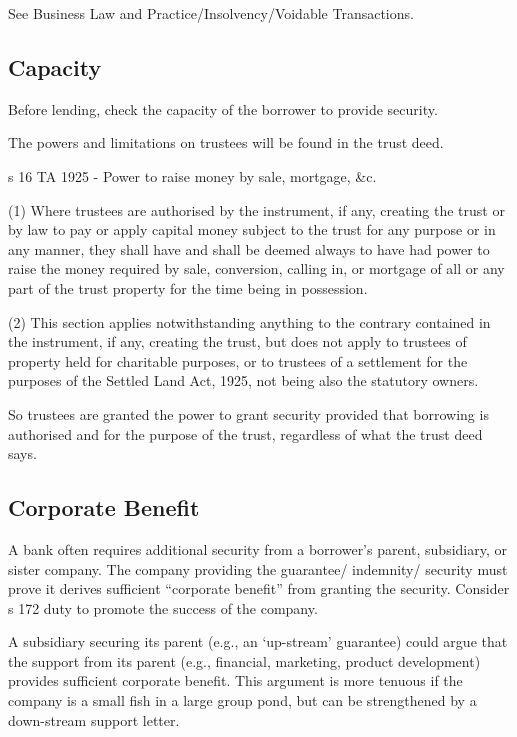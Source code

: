 \documentclass[
]{article}
\newenvironment{env-99ba4262-5297-4318-9547-86307715f49a}
{
    \savenotes\tcolorbox[blanker,breakable,left=5pt,borderline west={2pt}{-4pt}{green}]
}
{
    \endtcolorbox\spewnotes
}
\begin{document}
See Business Law and Practice/Insolvency/Voidable Transactions.

\hypertarget{capacity}{%
\subsection{Capacity}\label{capacity}}

Before lending, check the capacity of the borrower to provide security.

The powers and limitations on trustees will be found in the trust deed.

\begin{env-99ba4262-5297-4318-9547-86307715f49a}

s 16 TA 1925 - Power to raise money by sale, mortgage, \&c.

(1) Where trustees are authorised by the instrument, if any, creating
the trust or by law to pay or apply capital money subject to the trust
for any purpose or in any manner, they shall have and shall be deemed
always to have had power to raise the money required by sale,
conversion, calling in, or mortgage of all or any part of the trust
property for the time being in possession.

(2) This section applies notwithstanding anything to the contrary
contained in the instrument, if any, creating the trust, but does not
apply to trustees of property held for charitable purposes, or to
trustees of a settlement for the purposes of the Settled Land Act, 1925,
not being also the statutory owners.

\end{env-99ba4262-5297-4318-9547-86307715f49a}

So trustees are granted the power to grant security provided that
borrowing is authorised and for the purpose of the trust, regardless of
what the trust deed says.

\hypertarget{corporate-benefit}{%
\subsection{Corporate Benefit}\label{corporate-benefit}}

A bank often requires additional security from a borrower's parent,
subsidiary, or sister company. The company providing the guarantee/
indemnity/ security must prove it derives sufficient ``corporate
benefit'' from granting the security. Consider s 172 duty to promote the
success of the company.

A subsidiary securing its parent (e.g., an `up-stream' guarantee) could
argue that the support from its parent (e.g., financial, marketing,
product development) provides sufficient corporate benefit. This
argument is more tenuous if the company is a small fish in a large group
pond, but can be strengthened by a down-stream support letter.
\end{document}
